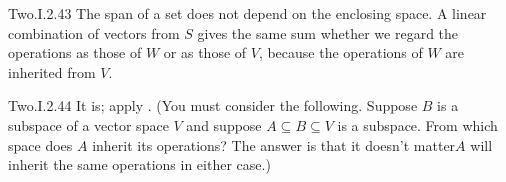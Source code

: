 \begin{ans}{Two.I.2.43}
      The span of a set does not depend on the enclosing space.
      A linear combination of vectors from \( S \) gives the same sum
      whether we regard the operations as those of \( W \) or as those of
      \( V \), because the operations of \( W \) are inherited from \(  V \).
    
\end{ans}
\begin{ans}{Two.I.2.44}
      It is;
      apply .
      (You must consider the following.
      Suppose \( B \) is a subspace of a vector space \( V \) and suppose
      \( A\subseteq B\subseteq V \) is a subspace.
      From which space does \( A \) inherit its operations?
      The answer is that it doesn't matter\Dash \( A \) will inherit the
      same operations in either case.)
    
\end{ans}
